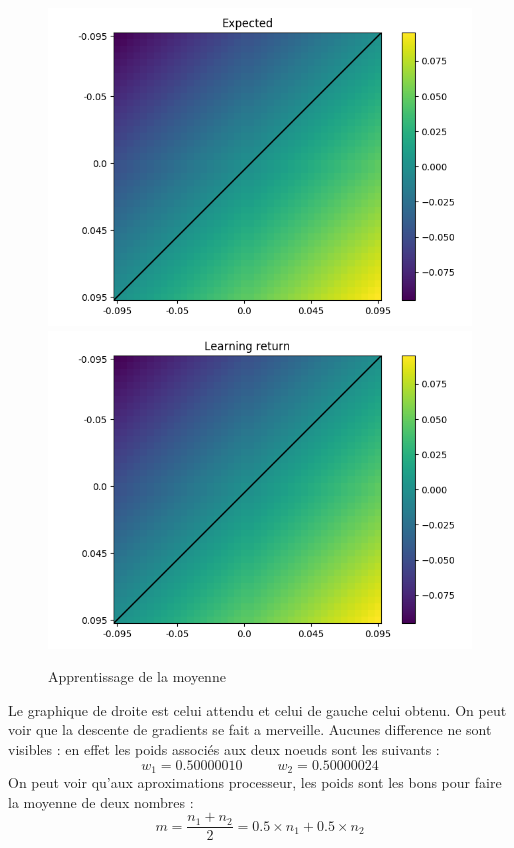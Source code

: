 \begin{figure}[H]
    \center
    \includegraphics[height=\petit]{sources/data/moy/expected}
    \includegraphics[height=\petit]{sources/data/moy/result}
	\caption{Apprentissage de la moyenne}
	\label{moy}
\end{figure}

Le graphique de droite est celui attendu et celui de gauche celui obtenu.
On peut voir que la descente de gradients se fait a merveille.
Aucunes difference ne sont visibles : en effet les poids associés aux deux noeuds sont les suivants :
\begin{equation*}
    w_1 = 0.50000010
    \;\;\;\;\;\;\;\;\;
    w_2 = 0.50000024
\end{equation*}
On peut voir qu'aux aproximations processeur, les poids sont les bons pour faire la moyenne de deux nombres :
\begin{equation*}
    m =\frac{n_1 + n_2}{2} = 0.5 \times n_1 + 0.5 \times n_2
\end{equation*}

